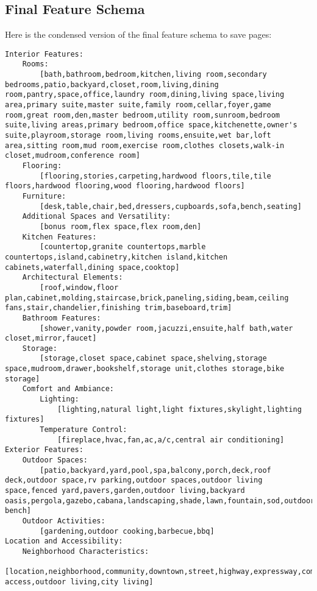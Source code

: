 \subsection{Final Feature Schema}
\label{app: final_feature_schema}
Here is the condensed version of the final feature schema to save pages: 
\begin{lstlisting}
Interior Features:
    Rooms:
        [bath,bathroom,bedroom,kitchen,living room,secondary bedrooms,patio,backyard,closet,room,living,dining room,pantry,space,office,laundry room,dining,living space,living area,primary suite,master suite,family room,cellar,foyer,game room,great room,den,master bedroom,utility room,sunroom,bedroom suite,living areas,primary bedroom,office space,kitchenette,owner's suite,playroom,storage room,living rooms,ensuite,wet bar,loft area,sitting room,mud room,exercise room,clothes closets,walk-in closet,mudroom,conference room]
    Flooring:
        [flooring,stories,carpeting,hardwood floors,tile,tile floors,hardwood flooring,wood flooring,hardwood floors]
    Furniture:
        [desk,table,chair,bed,dressers,cupboards,sofa,bench,seating]
    Additional Spaces and Versatility:
        [bonus room,flex space,flex room,den]
    Kitchen Features:
        [countertop,granite countertops,marble countertops,island,cabinetry,kitchen island,kitchen cabinets,waterfall,dining space,cooktop]
    Architectural Elements:
        [roof,window,floor plan,cabinet,molding,staircase,brick,paneling,siding,beam,ceiling fans,stair,chandelier,finishing trim,baseboard,trim]
    Bathroom Features:
        [shower,vanity,powder room,jacuzzi,ensuite,half bath,water closet,mirror,faucet]
    Storage:
        [storage,closet space,cabinet space,shelving,storage space,mudroom,drawer,bookshelf,storage unit,clothes storage,bike storage]
    Comfort and Ambiance:
        Lighting:
            [lighting,natural light,light fixtures,skylight,lighting fixtures]
        Temperature Control:
            [fireplace,hvac,fan,ac,a/c,central air conditioning]
Exterior Features:
    Outdoor Spaces:
        [patio,backyard,yard,pool,spa,balcony,porch,deck,roof deck,outdoor space,rv parking,outdoor spaces,outdoor living space,fenced yard,pavers,garden,outdoor living,backyard oasis,pergola,gazebo,cabana,landscaping,shade,lawn,fountain,sod,outdoor bench]
    Outdoor Activities:
        [gardening,outdoor cooking,barbecue,bbq]
Location and Accessibility:
    Neighborhood Characteristics:
        [location,neighborhood,community,downtown,street,highway,expressway,commuting,located,highway access,outdoor living,city living]

\end{lstlisting}
